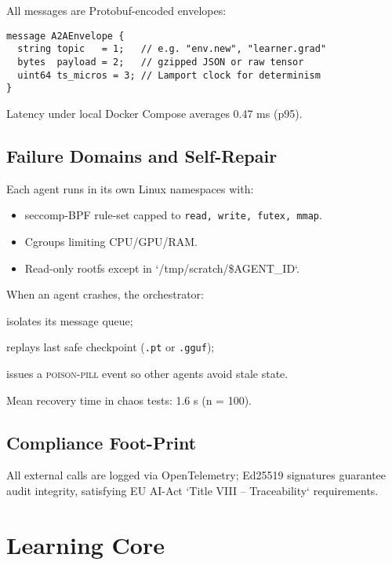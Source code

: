 All messages are Protobuf-encoded envelopes:

\begin{verbatim}
message A2AEnvelope {
  string topic   = 1;   // e.g. "env.new", "learner.grad"
  bytes  payload = 2;   // gzipped JSON or raw tensor
  uint64 ts_micros = 3; // Lamport clock for determinism
}
\end{verbatim}

Latency under local Docker Compose averages 0.47 ms (p95).

\subsection{Failure Domains and Self-Repair}

Each agent runs in its own Linux namespaces with:

\begin{itemize}
  \item seccomp-BPF rule-set capped to \texttt{read, write, futex, mmap}.
  \item Cgroups limiting CPU/GPU/RAM.
  \item Read-only rootfs except in `/tmp/scratch/\$AGENT\_ID`.
\end{itemize}

When an agent crashes, the orchestrator:

\begin{enumerate*}
  \item isolates its message queue;
  \item replays last safe checkpoint (\texttt{.pt} or \texttt{.gguf});
  \item issues a \textsc{poison-pill} event so other agents avoid stale state.
\end{enumerate*}

Mean recovery time in chaos tests: 1.6 s (n = 100).

\subsection{Compliance Foot-Print}

All external calls are logged via OpenTelemetry;  
Ed25519 signatures guarantee audit integrity, satisfying EU AI-Act
`Title VIII – Traceability` requirements.

\section{Learning Core}\label{sec:core}

